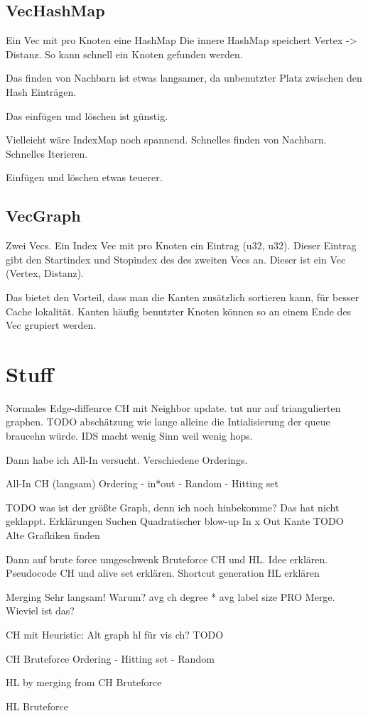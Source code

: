 \subsection{VecHashMap}
Ein Vec mit pro Knoten eine HashMap
Die innere HashMap speichert Vertex -> Distanz.
So kann schnell ein Knoten gefunden werden.

Das finden von Nachbarn ist etwas langsamer, da unbenutzter Platz zwischen den Hash Einträgen.

Das einfügen und löschen ist günstig.

Vielleicht wäre IndexMap noch spannend.
Schnelles finden von Nachbarn.
Schnelles Iterieren.

Einfügen und löschen etwas teuerer.

\subsection{VecGraph}
Zwei Vecs.
Ein Index Vec mit pro Knoten ein Eintrag (u32, u32).
Dieser Eintrag gibt den Startindex und Stopindex des des zweiten Vecs an.
Dieser ist ein Vec (Vertex, Distanz).

Das bietet den Vorteil, dass man die Kanten zusätzlich sortieren kann, für besser Cache lokalität.
Kanten häufig benutzter Knoten können so an einem Ende des Vec grupiert werden.

\section{Stuff}

Normales Edge-diffenrce CH mit Neighbor update.
tut nur auf triangulierten graphen.
TODO abschätzung wie lange alleine die Intialisierung der queue braucehn würde.
IDS macht wenig Sinn weil wenig hops.


Dann habe ich All-In versucht.
Verschiedene Orderings.

All-In CH (langsam)
Ordering
- in*out
- Random
- Hitting set

TODO was ist der größte Graph, denn ich noch hinbekomme?
Das hat nicht geklappt.
Erklärungen Suchen
Quadratischer blow-up In x Out Kante
TODO Alte Grafkiken finden




Dann auf brute force umgeschwenk
Bruteforce CH und HL.
Idee erklären.
Pseudocode CH und alive set erklären.
Shortcut generation
HL erklären


Merging
Sehr langsam!
Warum?
avg ch degree * avg label size PRO Merge. Wieviel ist das?




CH mit Heuristic:
Alt
graph hl für vis ch? TODO

CH Bruteforce
Ordering
- Hitting set
- Random

HL by merging from CH Bruteforce

HL Bruteforce


